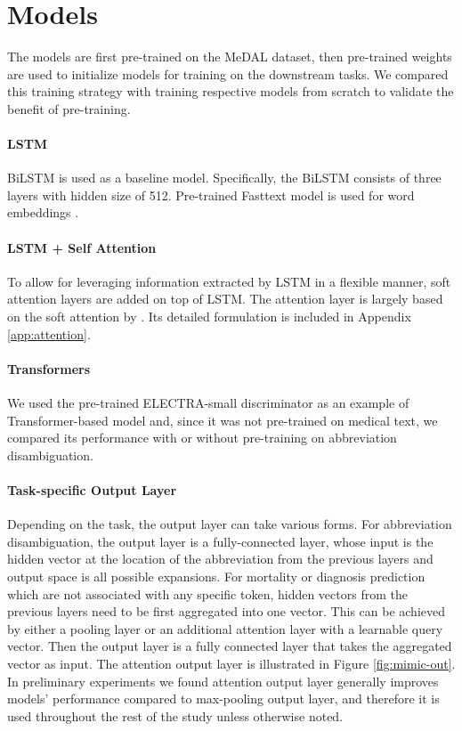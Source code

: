 \documentclass[11pt,a4paper]{article}
\begin{document}
\section{Models}\label{s:models}

The models are first pre-trained on the MeDAL dataset, then pre-trained weights are used to initialize models for training on the downstream tasks. We compared this training strategy with training respective models from scratch to validate the benefit of pre-training.

\paragraph{LSTM}

BiLSTM is used as a baseline model. Specifically, the BiLSTM consists of three layers with hidden size of 512. Pre-trained Fasttext model is used for word embeddings \citep{Bojanowski2017EnrichingInformation}.

\paragraph{LSTM + Self Attention}

To allow for leveraging information extracted by LSTM in a flexible manner, soft attention layers are added on top of LSTM. The attention layer is largely based on the soft attention by \citet{Bahdanau2014}. Its detailed formulation is included in Appendix \ref{app:attention}.

\paragraph{Transformers}

We used the pre-trained ELECTRA-small discriminator \citep{Clark2020ELECTRA:Generators} as an example of Transformer-based \citep{Vaswani2017} model and, since it was not pre-trained on medical text, we compared its performance with or without pre-training on abbreviation disambiguation. 

\paragraph{Task-specific Output Layer}

Depending on the task, the output layer can take various forms. For abbreviation disambiguation, the output layer is a fully-connected layer, whose input is the hidden vector at the location of the abbreviation from the previous layers and output space is all possible expansions. For mortality or diagnosis prediction which are not associated with any specific token, hidden vectors from the previous layers need to be first aggregated into one vector. This can be achieved by either a pooling layer or an additional attention layer with a learnable query vector. Then the output layer is a fully connected layer that takes the aggregated vector as input. The attention output layer is illustrated in Figure \ref{fig:mimic-out}. In preliminary experiments we found attention output layer generally improves models' performance compared to max-pooling output layer, and therefore it is used throughout the rest of the study unless otherwise noted.
\end{document}
